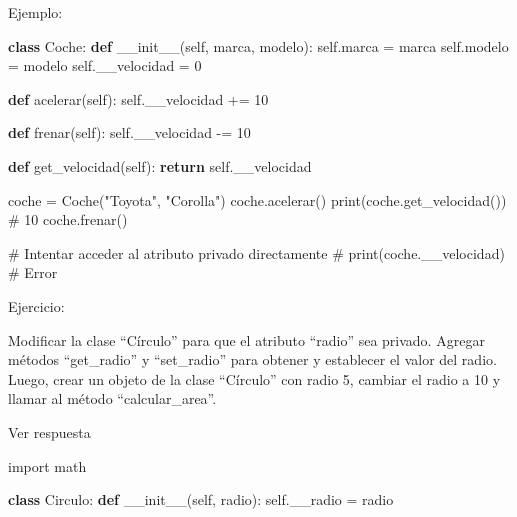 \documentclass[
  a4paper,
  DIV=11,
  numbers=noendperiod,
  onepage,
  openany]{scrreprt}
\newenvironment{Shaded}{\begin{snugshade}}{\end{snugshade}}
\newcommand{\BuiltInTok}[1]{\textcolor[rgb]{0.00,0.23,0.31}{#1}}
\newcommand{\CommentTok}[1]{\textcolor[rgb]{0.37,0.37,0.37}{#1}}
\newcommand{\ControlFlowTok}[1]{\textcolor[rgb]{0.00,0.23,0.31}{\textbf{#1}}}
\newcommand{\DecValTok}[1]{\textcolor[rgb]{0.68,0.00,0.00}{#1}}
\newcommand{\FunctionTok}[1]{\textcolor[rgb]{0.28,0.35,0.67}{#1}}
\newcommand{\ImportTok}[1]{\textcolor[rgb]{0.00,0.46,0.62}{#1}}
\newcommand{\KeywordTok}[1]{\textcolor[rgb]{0.00,0.23,0.31}{\textbf{#1}}}
\newcommand{\NormalTok}[1]{\textcolor[rgb]{0.00,0.23,0.31}{#1}}
\newcommand{\OperatorTok}[1]{\textcolor[rgb]{0.37,0.37,0.37}{#1}}
\newcommand{\StringTok}[1]{\textcolor[rgb]{0.13,0.47,0.30}{#1}}
\newcommand{\VariableTok}[1]{\textcolor[rgb]{0.07,0.07,0.07}{#1}}
\begin{document}
\begin{tcolorbox}
Ejemplo:

\begin{Shaded}
\begin{Highlighting}[]
\KeywordTok{class}\NormalTok{ Coche:}
    \KeywordTok{def} \FunctionTok{\_\_init\_\_}\NormalTok{(}\VariableTok{self}\NormalTok{, marca, modelo):}
        \VariableTok{self}\NormalTok{.marca }\OperatorTok{=}\NormalTok{ marca}
        \VariableTok{self}\NormalTok{.modelo }\OperatorTok{=}\NormalTok{ modelo}
        \VariableTok{self}\NormalTok{.\_\_velocidad }\OperatorTok{=} \DecValTok{0}

    \KeywordTok{def}\NormalTok{ acelerar(}\VariableTok{self}\NormalTok{):}
        \VariableTok{self}\NormalTok{.\_\_velocidad }\OperatorTok{+=} \DecValTok{10}

    \KeywordTok{def}\NormalTok{ frenar(}\VariableTok{self}\NormalTok{):}
        \VariableTok{self}\NormalTok{.\_\_velocidad }\OperatorTok{{-}=} \DecValTok{10}

    \KeywordTok{def}\NormalTok{ get\_velocidad(}\VariableTok{self}\NormalTok{):}
        \ControlFlowTok{return} \VariableTok{self}\NormalTok{.\_\_velocidad}

\NormalTok{coche }\OperatorTok{=}\NormalTok{ Coche(}\StringTok{"Toyota"}\NormalTok{, }\StringTok{"Corolla"}\NormalTok{)}
\NormalTok{coche.acelerar()}
\BuiltInTok{print}\NormalTok{(coche.get\_velocidad())  }\CommentTok{\# 10}
\NormalTok{coche.frenar()}

\CommentTok{\# Intentar acceder al atributo privado directamente}
\CommentTok{\# print(coche.\_\_velocidad)  \# Error}
\end{Highlighting}
\end{Shaded}

Ejercicio:

Modificar la clase ``Círculo'' para que el atributo ``radio'' sea
privado. Agregar métodos ``get\_radio'' y ``set\_radio'' para obtener y
establecer el valor del radio. Luego, crear un objeto de la clase
``Círculo'' con radio 5, cambiar el radio a 10 y llamar al método
``calcular\_area''.

Ver respuesta

\begin{Shaded}
\begin{Highlighting}[]
\ImportTok{import}\NormalTok{ math}

\KeywordTok{class}\NormalTok{ Circulo:}
    \KeywordTok{def} \FunctionTok{\_\_init\_\_}\NormalTok{(}\VariableTok{self}\NormalTok{, radio):}
        \VariableTok{self}\NormalTok{.\_\_radio }\OperatorTok{=}\NormalTok{ radio}


\end{Highlighting}
\end{Shaded}
\end{tcolorbox}
\end{document}
